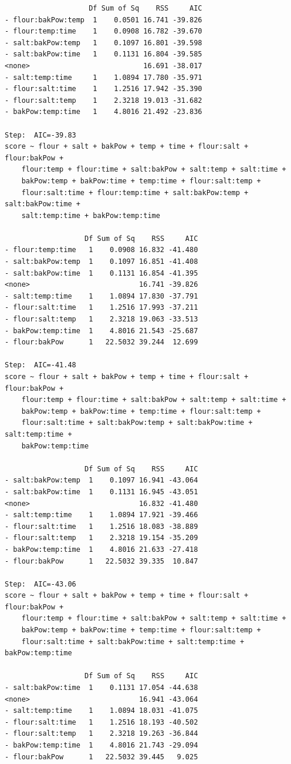 \documentclass[
  a4paper,
]{scrbook}
\begin{document}
\begin{verbatim}
                    Df Sum of Sq    RSS     AIC
- flour:bakPow:temp  1    0.0501 16.741 -39.826
- flour:temp:time    1    0.0908 16.782 -39.670
- salt:bakPow:temp   1    0.1097 16.801 -39.598
- salt:bakPow:time   1    0.1131 16.804 -39.585
<none>                           16.691 -38.017
- salt:temp:time     1    1.0894 17.780 -35.971
- flour:salt:time    1    1.2516 17.942 -35.390
- flour:salt:temp    1    2.3218 19.013 -31.682
- bakPow:temp:time   1    4.8016 21.492 -23.836

Step:  AIC=-39.83
score ~ flour + salt + bakPow + temp + time + flour:salt + flour:bakPow + 
    flour:temp + flour:time + salt:bakPow + salt:temp + salt:time + 
    bakPow:temp + bakPow:time + temp:time + flour:salt:temp + 
    flour:salt:time + flour:temp:time + salt:bakPow:temp + salt:bakPow:time + 
    salt:temp:time + bakPow:temp:time

                   Df Sum of Sq    RSS     AIC
- flour:temp:time   1    0.0908 16.832 -41.480
- salt:bakPow:temp  1    0.1097 16.851 -41.408
- salt:bakPow:time  1    0.1131 16.854 -41.395
<none>                          16.741 -39.826
- salt:temp:time    1    1.0894 17.830 -37.791
- flour:salt:time   1    1.2516 17.993 -37.211
- flour:salt:temp   1    2.3218 19.063 -33.513
- bakPow:temp:time  1    4.8016 21.543 -25.687
- flour:bakPow      1   22.5032 39.244  12.699

Step:  AIC=-41.48
score ~ flour + salt + bakPow + temp + time + flour:salt + flour:bakPow + 
    flour:temp + flour:time + salt:bakPow + salt:temp + salt:time + 
    bakPow:temp + bakPow:time + temp:time + flour:salt:temp + 
    flour:salt:time + salt:bakPow:temp + salt:bakPow:time + salt:temp:time + 
    bakPow:temp:time

                   Df Sum of Sq    RSS     AIC
- salt:bakPow:temp  1    0.1097 16.941 -43.064
- salt:bakPow:time  1    0.1131 16.945 -43.051
<none>                          16.832 -41.480
- salt:temp:time    1    1.0894 17.921 -39.466
- flour:salt:time   1    1.2516 18.083 -38.889
- flour:salt:temp   1    2.3218 19.154 -35.209
- bakPow:temp:time  1    4.8016 21.633 -27.418
- flour:bakPow      1   22.5032 39.335  10.847

Step:  AIC=-43.06
score ~ flour + salt + bakPow + temp + time + flour:salt + flour:bakPow + 
    flour:temp + flour:time + salt:bakPow + salt:temp + salt:time + 
    bakPow:temp + bakPow:time + temp:time + flour:salt:temp + 
    flour:salt:time + salt:bakPow:time + salt:temp:time + bakPow:temp:time

                   Df Sum of Sq    RSS     AIC
- salt:bakPow:time  1    0.1131 17.054 -44.638
<none>                          16.941 -43.064
- salt:temp:time    1    1.0894 18.031 -41.075
- flour:salt:time   1    1.2516 18.193 -40.502
- flour:salt:temp   1    2.3218 19.263 -36.844
- bakPow:temp:time  1    4.8016 21.743 -29.094
- flour:bakPow      1   22.5032 39.445   9.025


\end{verbatim}
\end{document}
